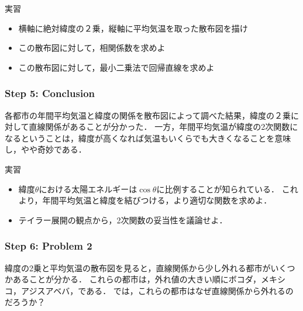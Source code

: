 %
\begin{itembox}[l]{実習}
%
\begin{itemize}
\item
横軸に絶対緯度の２乗，縦軸に平均気温を取った散布図を描け
\item
この散布図に対して，相関係数を求めよ
\item
この散布図に対して，最小二乗法で回帰直線を求めよ
\end{itemize}
%
\end{itembox}
%

%

\subsubsection*{Step 5: Conclusion}
%
各都市の年間平均気温と緯度の関係を散布図によって調べた結果，緯度の２乗に対して直線関係があることが分かった．
%
一方，年間平均気温が緯度の2次関数になるということは，緯度が高くなれば気温もいくらでも大きくなることを意味し，やや奇妙である．

%
\vspace{0.5cm}
\begin{itembox}[l]{実習}
%
\begin{itemize}
\item
緯度$ \theta $における太陽エネルギーは$ \cos\theta $に比例することが知られている．
これより，年間平均気温と緯度を結びつける，より適切な関数を求めよ．
\item
テイラー展開の観点から，2次関数の妥当性を議論せよ．
\end{itemize}
%
\end{itembox}
%

%

\subsubsection*{Step 6: Problem 2}
%
緯度の2乗と平均気温の散布図を見ると，直線関係から少し外れる都市がいくつかあることが分かる．
%
これらの都市は，外れ値の大きい順にボコダ，メキシコ，アジスアベバ，である．
%
では，これらの都市はなぜ直線関係から外れるのだろうか？

